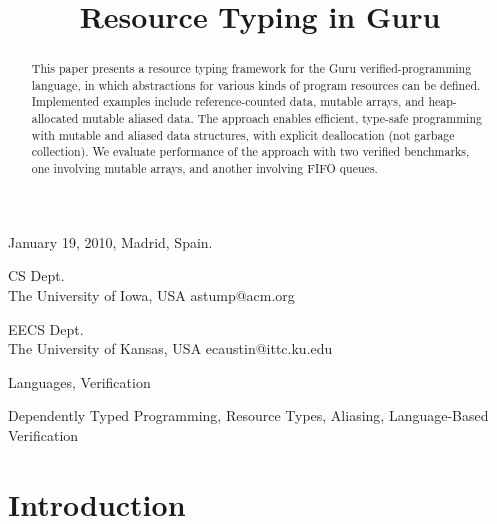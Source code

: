 \documentclass[9pt,natbib]{sigplanconf}
\begin{document}
 {January 19, 2010, Madrid, Spain.}
\copyrightdata{\ } 

\titlebanner{\ }        %
\preprintfooter{\ }   %



\title{Resource Typing in Guru}

{CS Dept.\\ The University of Iowa, USA}
{astump@acm.org}

{EECS Dept.\\ The University of Kansas, USA}
{ecaustin@ittc.ku.edu}

\maketitle


\begin{abstract}
This paper presents a resource typing framework for the Guru
verified-programming language, in which abstractions for various kinds
of program resources can be defined.  Implemented examples include
reference-counted data, mutable arrays, and heap-allocated mutable
aliased data.  The approach enables efficient, type-safe programming
with mutable and aliased data structures, with explicit deallocation
(not garbage collection).  We evaluate performance of the approach
with two verified benchmarks, one involving mutable arrays, and
another involving FIFO queues.
\end{abstract}


\terms
Languages, Verification

\keywords
Dependently Typed Programming, Resource Types, Aliasing, Language-Based Verification

\section{Introduction}
\end{document}
